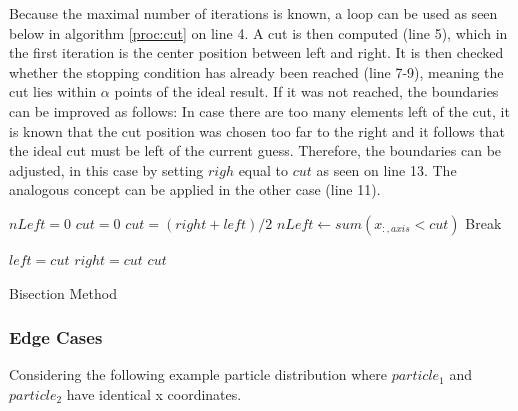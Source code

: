 \documentclass[]{article}
\begin{document}
Because the maximal number of iterations is known, a loop can be used as seen below in algorithm \ref{proc:cut} on line 4. A cut is then computed (line 5), which in the first iteration is the center position between left and right. It is then checked whether the stopping condition has already been reached (line 7-9), meaning the cut lies within $\alpha$ points of the ideal result. If it was not reached, the boundaries can be improved as follows: In case there are too many elements left of the cut, it is known that the cut position was chosen too far to the right and it follows that the ideal cut must be left of the current guess. Therefore, the boundaries can be adjusted, in this case by setting $righ$ equal to $cut$ as seen on line 13. The analogous concept can be applied in the other case (line 11). 

\begin{algorithm}[H]
		\begin{algorithmic}[1]
			\State $nLeft = 0$
			\State $cut = 0$
			\newline
			\State $cut = (right + left ) / 2 $
			\State $nLeft\gets sum(x_{:,axis} < cut)$ 
			\newline
			\State Break 
			\EndIf
			\newline
			
			\State $left = cut$
			\Else 
			\State $right = cut$
			\EndIf
			\newline
			\EndFor
			\State \Return $cut$
			\EndProcedure
		\end{algorithmic}
\caption{Bisection Method}
\label{proc:cut}
\end{algorithm}


\subsubsection{Edge Cases}

Considering the following example particle distribution where $particle_1$ and $particle_2$ have identical x coordinates. 

\begin{figure}[H]
	\begin{center}
	\end{center}
\end{figure}
\end{document}

